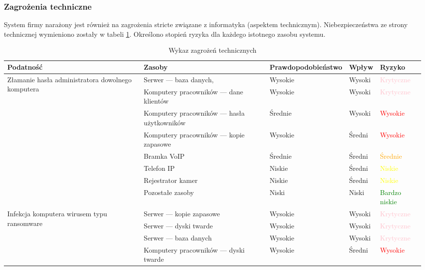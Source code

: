 \subsubsection{Zagrożenia techniczne}
System firmy narażony jest również na zagrożenia stricte związane z informatyka (aspektem technicznym). Niebezpieczeństwa ze strony technicznej wymieniono zostały w tabeli  \ref{tab:zagrozenia_techniczne}. Określono stopień ryzyka dla każdego istotnego zasobu systemu.

\begin{landscape}
	\begin{longtable}[ht!]{|m{4cm}|m{6cm}|m{4.5cm}|m{3cm}|m{3cm}|}
	\caption{Wykaz zagrożeń technicznych}
	\label{tab:zagrozenia_techniczne}\\
	\hline	
	\textbf{Podatność} & \textbf{Zasoby} & \textbf{Prawdopodobieństwo} & \textbf{Wpływ} &  \textbf{Ryzyko} \\ \hline
	\multirow{5}{4cm}{Złamanie hasła administratora dowolnego komputera}  
		&   Serwer --- baza danych,  & Wysokie & Wysoki & \textcolor{pink}{Krytyczne}  \\ \cline{2-5}
		& Komputery pracowników --- dane klientów & Wysokie & Wysoki & \textcolor{pink}{Krytyczne} \\ \cline{2-5}
		& Komputery pracowników --- hasła użytkowników & Średnie & Wysoki & \textcolor{red}{Wysokie} \\ \cline{2-5}
		& Komputery pracowników --- kopie zapasowe & Wysokie & Średni & \textcolor{red}{Wysokie} \\ \cline{2-5}
		& Bramka VoIP & Średnie & Średni & \textcolor{orange}{Średnie} \\ \cline{2-5}
		& Telefon IP & Niskie & Średni & \textcolor{yellow}{Niskie} \\ \cline{2-5}
		& Rejestrator kamer & Niskie & Średni & \textcolor{yellow}{Niskie} \\ \cline{2-5}
		& Pozostałe zasoby & Niski & Niski & \textcolor{green}{Bardzo niskie} \\ \cline{2-5}
	\hline
	\multirow{8}{4cm}{Infekcja komputera wirusem typu ransomware}
		& Serwer --- kopie zapasowe & Wysokie & Wysoki & \textcolor{pink}{Krytyczne} \\ \cline{2-5}
		& Serwer --- dyski twarde & Wysokie & Wysoki & \textcolor{pink}{Krytyczne} \\ \cline{2-5}
		& Serwer --- baza danych & Wysokie & Wysoki & \textcolor{pink}{Krytyczne} \\ \cline{2-5}
		& Komputery pracowników --- dyski twarde & Wysokie & Średni & \textcolor{red}{Wysokie} \\ \cline{2-5}

\end{longtable}
\end{landscape}

